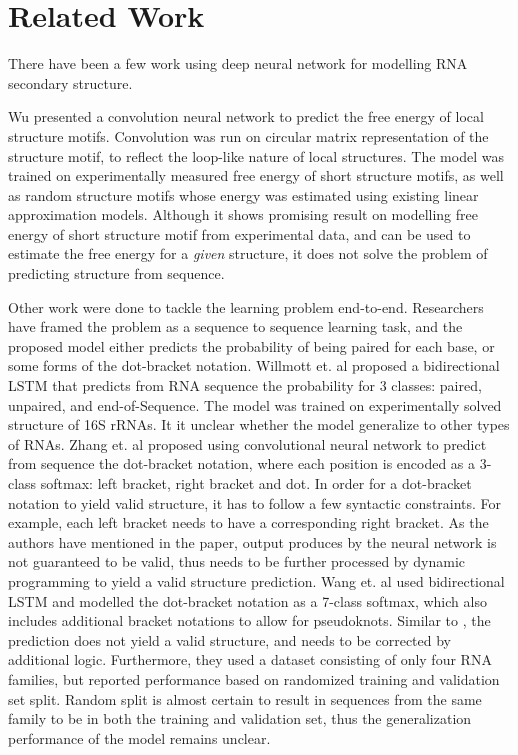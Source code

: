 \documentclass{article}
\begin{document}

\section{Related Work}

There have been a few work using deep neural network for modelling RNA secondary structure.

Wu\cite{wu2018convolutional} presented a convolution neural network to predict the free energy of local structure motifs.
Convolution was run on circular matrix representation of the structure motif, to reflect the loop-like nature of local structures.
The model was trained on experimentally measured free energy of short structure motifs,
as well as random structure motifs whose energy was estimated using existing linear approximation models.
Although it shows promising result on modelling free energy of short structure motif from experimental data,
and can be used to estimate the free energy for a \textit{given} structure,
it does not solve the problem of predicting structure from sequence.

Other work were done to tackle the learning problem end-to-end.
Researchers have framed the problem as a sequence to sequence learning task,
and the proposed model either predicts the probability of being paired for each base,
or some forms of the dot-bracket notation.
Willmott et. al\cite{willmottstate} proposed a bidirectional LSTM that predicts
from RNA sequence the probability for 3 classes: paired, unpaired, and end-of-Sequence.
The model was trained on experimentally solved structure of 16S rRNAs.
It it unclear whether the model generalize to other types of RNAs.
Zhang et. al\cite{zhang2019new} proposed using convolutional neural network to predict from sequence
the dot-bracket notation, where each position is encoded as a 3-class softmax: left bracket, right bracket and dot.
In order for a dot-bracket notation to yield valid structure, it has to follow a few syntactic constraints.
For example, each left bracket needs to have a corresponding right bracket.
As the authors have mentioned in the paper, output produces by the neural network
is not guaranteed to be valid, thus needs to be further processed by dynamic programming
to yield a valid structure prediction.
Wang et. al\cite{wang2019dmfold} used bidirectional LSTM and modelled the dot-bracket notation as a
7-class softmax, which also includes additional bracket notations to allow for pseudoknots.
Similar to \cite{zhang2019new}, the prediction does not yield a valid structure, and needs to be corrected by additional logic.
Furthermore, they used a dataset consisting of only four RNA families,
but reported performance based on randomized training and validation set split.
Random split is almost certain to result in sequences from the same family to be in both the training and validation set,
thus the generalization performance of the model remains unclear.
\end{document}

